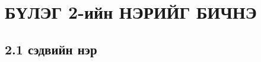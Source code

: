 
\chapter{БҮЛЭГ 2-ийн НЭРИЙГ БИЧНЭ} %

\label{Chapter2} %
\pagecolor{white}

\section{2.1 сэдвийн нэр}